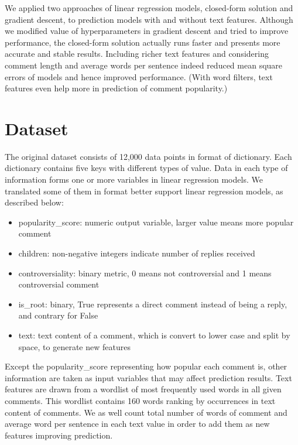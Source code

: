 \documentclass[letterpaper, 12pt]{article}
\begin{document}
We applied two approaches of linear regression models, closed-form solution and gradient descent, to prediction models with and without text features. Although we modified value of hyperparameters in gradient descent and tried to improve performance, the closed-form solution actually runs faster and presents more accurate and stable results. Including richer text features and considering comment length and average words per sentence indeed reduced mean square errors of models and hence improved performance. (With word filters, text features even help more in prediction of comment popularity.) 

\section*{Dataset}

The original dataset consists of 12,000 data points in format of dictionary. Each dictionary contains five keys with different types of value. Data in each type of information forms one or more variables in linear regression models. We translated some of them in format better support linear regression models, as described below:

\begin{itemize}
    \item popularity\_score: numeric output variable, larger value means more popular comment
    \item children: non-negative integers indicate number of replies received
    \item controversiality: binary metric, 0 means not controversial and 1 means controversial comment
    \item is\_root: binary, True represents a direct comment instead of being a reply, and contrary for False
    \item text: text content of a comment, which is convert to lower case and split by space, to generate new features
\end{itemize}

Except the popularity\_score representing how popular each comment is, other information are taken as input variables that may affect prediction results. Text features are drawn from a wordlist of most frequently used words in all given comments. This wordlist contains 160 words ranking by occurrences in text content of comments. We as well count total number of words of comment and average word per sentence in each text value in order to add them as new features improving prediction.\\
\end{document}

